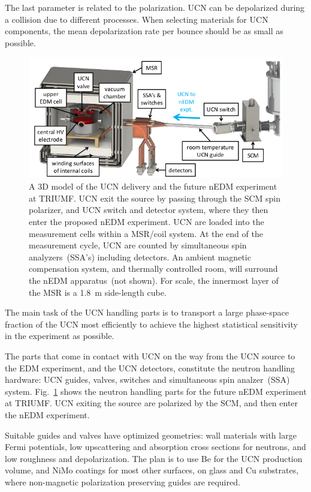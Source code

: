 The last parameter is related to the polarization. UCN can be
depolarized during a collision due to different processes.
When selecting materials for UCN components, the mean depolarization
rate per bounce should be as small as possible.
\begin{figure}[h!]
  \centering
  \includegraphics[width=1.0\textwidth]{UCNdelivery.png}
  \caption{A 3D model of the UCN delivery and the future nEDM
    experiment at TRIUMF. UCN exit the source by passing through the
    SCM spin polarizer, and UCN switch and detector system, where they
    then enter the proposed nEDM experiment. UCN are loaded into the
    measurement cells within a MSR/coil system. At the end of the
    measurement cycle, UCN are counted by simultaneous spin
    analyzers~(SSA’s) including detectors. An ambient magnetic
    compensation system, and thermally controlled room, will
    surround the nEDM apparatus~(not shown). For scale, the innermost
    layer of the MSR is a 1.8~m side-length cube.}
  \label{fig:UCNdelivery}
\end{figure}



The main task of the UCN handling parts is to transport a large
phase-space fraction of the UCN most efficiently to achieve the
highest statistical sensitivity in the experiment as possible.

The parts that come in contact with UCN on the way from the UCN source
to the EDM experiment, and the UCN detectors, constitute the neutron
handling hardware: UCN guides, valves, switches and simultaneous spin
analzer~(SSA) system. Fig.~\ref{fig:UCNdelivery} shows the neutron
handling parts for the future nEDM experiment at TRIUMF.  UCN exiting the
source are polarized by the SCM, and then enter the nEDM experiment.

Suitable guides and valves have optimized geometries: wall materials
with large Fermi potentials, low upscattering and absorption cross
sections for neutrons, and low roughness and depolarization. The plan is
to use Be for the UCN production volume, and NiMo coatings for most
other surfaces, on glass and Cu substrates, where non-magnetic
polarization preserving guides are required.  

